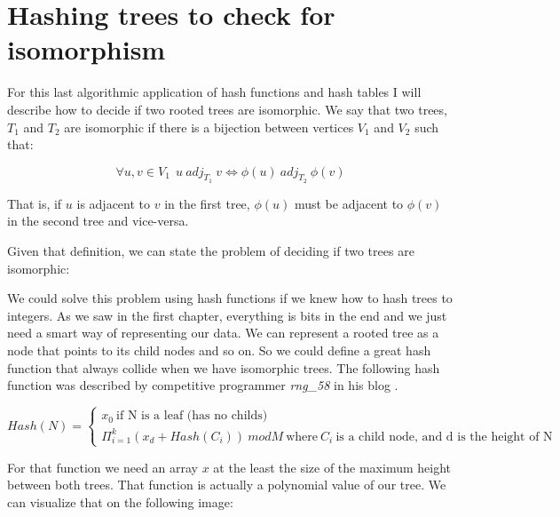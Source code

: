 \section{Hashing trees to check for isomorphism}

For this last algorithmic application of hash functions and hash tables I will describe how to decide if two rooted trees are isomorphic. We say that two trees,  \( T_1 \) and \( T_2 \) are isomorphic if there is a bijection between vertices \(V_1 \) and \(V_2 \) such that:

\[ \forall u, v \in V_1~ ~ u ~adj_{T_1} ~v \iff \phi(u) ~adj_{T_2} ~\phi(v) \]

That is, if \(u \) is adjacent to \( v \) in the first tree, \( \phi(u) \) must be adjacent to \( \phi(v) \) in the second tree and vice-versa.

Given that definition, we can state the problem of deciding if two trees are isomorphic:

\medskip


\medskip

We could solve this problem using hash functions if we knew how to hash trees to integers. As we saw in the first chapter, everything is bits in the end and we just need a smart way of representing our data. We can represent a rooted tree as a node that points to its child nodes and so on. So we could define a great hash function that always collide when we have isomorphic trees. The following hash function was described by competitive programmer \textit{rng\_58} in his blog \citep{TreeIsomorphism}.


\[ Hash(N) = \begin{cases} x_0 ~\text{if N is a leaf (has no childs)} \\
    \Pi_{i = 1}^{k} (x_d + Hash(C_i)) ~mod M ~\text{where} ~C_i ~\text{is a child node, and d is the height of N}
  \end{cases} \]

For that function we need an array \( x \) at the least the size of the maximum height between both trees. That function is actually a polynomial value of our tree. We can visualize that on the following image:

